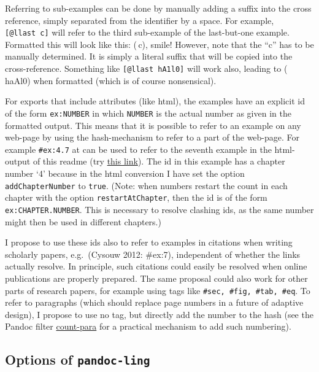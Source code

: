 \documentclass[
]{article}
\begin{document}
Referring to sub-examples can be done by manually adding a suffix into
the cross reference, simply separated from the identifier by a space.
For example, \texttt{{[}@llast~c{]}} will refer to the third sub-example
of the last-but-one example. Formatted this will look like this:
(\,c), smile! However, note that the ``c'' has to be
manually determined. It is simply a literal suffix that will be copied
into the cross-reference. Something like \texttt{{[}@llast\ hA1l0{]}}
will work also, leading to (\,haAl0) when formatted (which
is of course nonsensical).

For exports that include attributes (like html), the examples have an
explicit id of the form \texttt{ex:NUMBER} in which \texttt{NUMBER} is
the actual number as given in the formatted output. This means that it
is possible to refer to an example on any web-page by using the
hash-mechanism to refer to a part of the web-page. For example
\texttt{\#ex:4.7} at can be used to refer to the seventh example in the
html-output of this readme (try
\href{https://gitcdn.link/repo/cysouw/pandoc-ling/main/tests/readme.html\#ex:4.7}{this
link}). The id in this example has a chapter number `4' because in the
html conversion I have set the option \texttt{addChapterNumber} to
\texttt{true}. (Note: when numbers restart the count in each chapter
with the option \texttt{restartAtChapter}, then the id is of the form
\texttt{ex:CHAPTER.NUMBER}. This is necessary to resolve clashing ids,
as the same number might then be used in different chapters.)

I propose to use these ids also to refer to examples in citations when
writing scholarly papers, e.g.~(Cysouw 2012: \#ex:7), independent of
whether the links actually resolve. In principle, such citations could
easily be resolved when online publications are properly prepared. The
same proposal could also work for other parts of research papers, for
example using tags like \texttt{\#sec,\ \#fig,\ \#tab,\ \#eq}. To refer
to paragraphs (which should replace page numbers in a future of adaptive
design), I propose to use no tag, but directly add the number to the
hash (see the Pandoc filter
\href{https://github.com/cysouw/count-para}{count-para} for a practical
mechanism to add such numbering).

\hypertarget{options-of-pandoc-ling}{%
\subsection{\texorpdfstring{Options of
\texttt{pandoc-ling}}{Options of pandoc-ling}}\label{options-of-pandoc-ling}}
\end{document}
